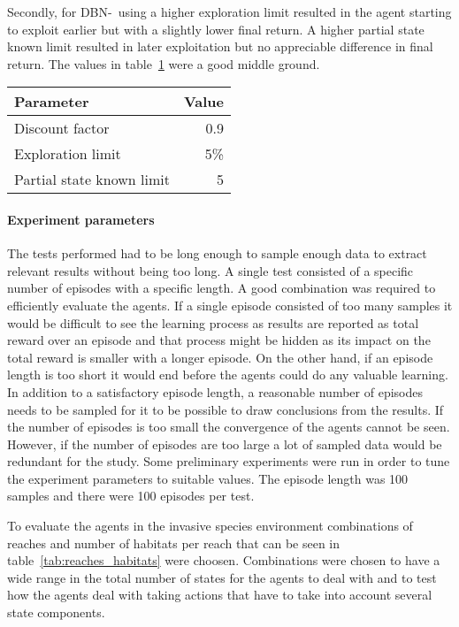 Secondly, for DBN-\etre\ using a higher exploration limit resulted in the agent starting to exploit earlier but with a slightly lower final return. A higher partial state known limit resulted in later exploitation but no appreciable difference in final return. The values in table~\ref{tab:dbne3_params} were a good middle ground.

\begin{table}[H]
\label{tab:dbne3_params}
\centering
\begin{tabular}{lr}
 \toprule
 Parameter & Value \\
 \midrule
 Discount factor & 0.9 \\
 Exploration limit & 5\% \\
 Partial state known limit & 5 \\
 \bottomrule
\end{tabular}
\end{table}

\paragraph{Experiment parameters}
The tests performed had to be long enough to sample enough data to extract relevant results without being too long. A single test consisted of a specific number of episodes with a specific length. A good combination was required to efficiently evaluate the agents. If a single episode consisted of too many samples it would be difficult to see the learning process as results are reported as total reward over an episode and that process might be hidden as its impact on the total reward is smaller with a longer episode. On the other hand, if an episode length is too short it would end before the agents could do any valuable learning. In addition to a satisfactory episode length, a reasonable number of episodes needs to be sampled for it to be possible to draw conclusions from the results. If the number of episodes is too small the convergence of the agents cannot be seen. However, if the number of episodes are too large a lot of sampled data would be redundant for the study. Some preliminary experiments were run in order to tune the experiment parameters to suitable values. The episode length was 100 samples and there were 100 episodes per test.

To evaluate the agents in the invasive species environment combinations of reaches and number of habitats per reach that can be seen in table~\ref{tab:reaches_habitats} were choosen. Combinations were chosen to have a wide range in the total number of states for the agents to deal with and to test how the agents deal with taking actions that have to take into account several state components.

